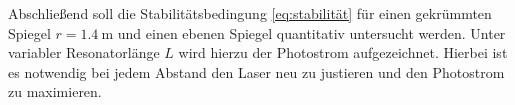 Abschließend soll die Stabilitätsbedingung \eqref{eq:stabilität} für
einen gekrümmten Spiegel $r = \SI{1.4}{\meter}$ und einen ebenen Spiegel quantitativ untersucht werden. Unter variabler Resonatorlänge $L$ wird hierzu der
Photostrom aufgezeichnet. Hierbei ist es notwendig bei jedem Abstand den Laser neu zu justieren und den Photostrom zu maximieren.
